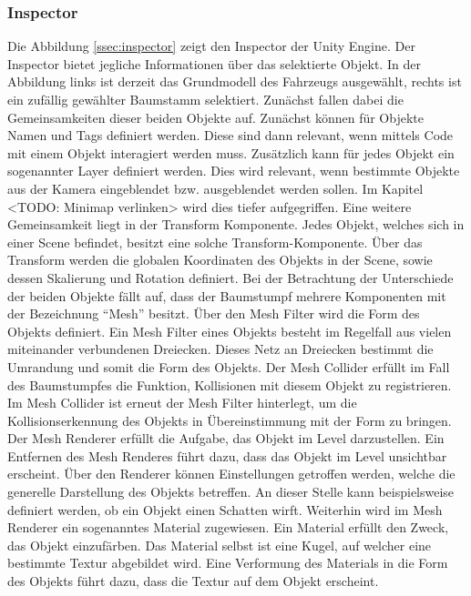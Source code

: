 \subsubsection{Inspector}
Die Abbildung \ref{ssec:inspector} zeigt den Inspector der Unity Engine. Der Inspector bietet jegliche Informationen über das selektierte Objekt. In der Abbildung links ist derzeit das Grundmodell des Fahrzeugs ausgewählt, rechts ist ein zufällig gewählter Baumstamm selektiert.
Zunächst fallen dabei die Gemeinsamkeiten dieser beiden Objekte auf. Zunächst können für Objekte Namen und Tags definiert werden. Diese sind dann relevant, wenn mittels Code mit einem Objekt interagiert werden muss. Zusätzlich kann für jedes Objekt ein sogenannter Layer definiert werden. Dies wird relevant, wenn bestimmte Objekte aus der Kamera eingeblendet bzw. ausgeblendet werden sollen. Im Kapitel <TODO: Minimap verlinken> wird dies tiefer aufgegriffen. Eine weitere Gemeinsamkeit liegt in der Transform Komponente. Jedes Objekt, welches sich in einer Scene befindet, besitzt eine solche Transform-Komponente. Über das Transform werden die globalen Koordinaten des Objekts in der Scene, sowie dessen Skalierung und Rotation definiert.
Bei der Betrachtung der Unterschiede der beiden Objekte fällt auf, dass der Baumstumpf mehrere Komponenten mit der Bezeichnung \enquote{Mesh} besitzt.
Über den Mesh Filter wird die Form des Objekts definiert. Ein Mesh Filter eines Objekts besteht im Regelfall aus vielen miteinander verbundenen Dreiecken. Dieses Netz an Dreiecken bestimmt die Umrandung und somit die Form des Objekts.
Der Mesh Collider erfüllt im Fall des Baumstumpfes die Funktion, Kollisionen mit diesem Objekt zu registrieren. Im Mesh Collider ist erneut der Mesh Filter hinterlegt, um die Kollisionserkennung des Objekts in Übereinstimmung mit der Form zu bringen.
Der Mesh Renderer erfüllt die Aufgabe, das Objekt im Level darzustellen. Ein Entfernen des Mesh Renderes führt dazu, dass das Objekt im Level unsichtbar erscheint. Über den Renderer können Einstellungen getroffen werden, welche die generelle Darstellung des Objekts betreffen. An dieser Stelle kann beispielsweise definiert werden, ob ein Objekt einen Schatten wirft. Weiterhin wird im Mesh Renderer ein sogenanntes Material zugewiesen. Ein Material erfüllt den Zweck, das Objekt einzufärben. Das Material selbst ist eine Kugel, auf welcher eine bestimmte Textur abgebildet wird. Eine Verformung des Materials in die Form des Objekts führt dazu, dass die Textur auf dem Objekt erscheint.
